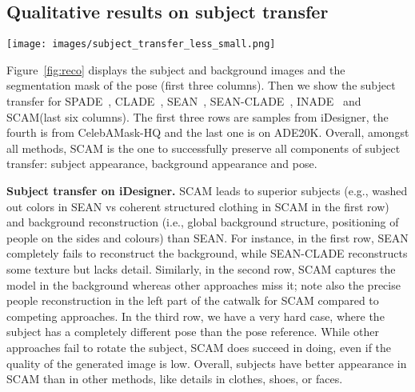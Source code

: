 \documentclass[runningheads]{llncs}
\makeatletter
\newcommand{\mname}{SCAM\@\xspace}
\makeatother
\begin{document}
\subsection{Qualitative results on subject transfer}
\begin{figure*}[t] 
    \centering
    \texttt{[image: images/subject\_transfer\_less\_small.png]}
    \caption{\small{\textbf{Subject Transfer} on the test set of iDesigner~\cite{idesigner}, CelebAMask-HQ\cite{lee2020maskgan} and ADE20K\cite{zhou2017scene}. Note the hard case in row 3, where only \mname rotates the subject. For ADE20K, we consider the house as the subject in the 5th row. }}
    \label{fig:subject_transfer}
\end{figure*}
Figure~\ref{fig:reco} displays the subject and background images and the segmentation mask of the pose (first three columns). Then we show the subject transfer for SPADE~\cite{park2019semantic}, CLADE~\cite{tan2021efficient}, SEAN~\cite{Zhu_2020}, SEAN-CLADE~\cite{tan2021efficient}, INADE~\cite{tan2021diverse} and \mname (last six columns). The first three rows are samples from iDesigner, the fourth is from CelebAMask-HQ and the last one is on ADE20K.
Overall, amongst all methods, \mname is the one to successfully preserve all components of subject transfer: subject appearance, background appearance and pose.



\noindent \textbf{Subject transfer on iDesigner.} \mname leads to superior subjects (e.g., washed out colors in SEAN vs coherent structured clothing in \mname in the first row) and background reconstruction (i.e., global background structure, positioning of people on the sides and colours) than SEAN. For instance, in the first row, SEAN completely fails to reconstruct the background, while SEAN-CLADE reconstructs some texture but lacks detail. Similarly, in the second row, \mname captures the model in the background whereas other approaches miss it; note also the precise people reconstruction in the left part of the catwalk for \mname compared to competing approaches. In the third row, we have a very hard case, where the subject has a completely different pose than the pose reference. While other approaches fail to rotate the subject, \mname does succeed in doing, even if the quality of the generated image is low. Overall, subjects have better appearance in \mname than in other methods, like details in clothes, shoes, or faces.
\end{document}
